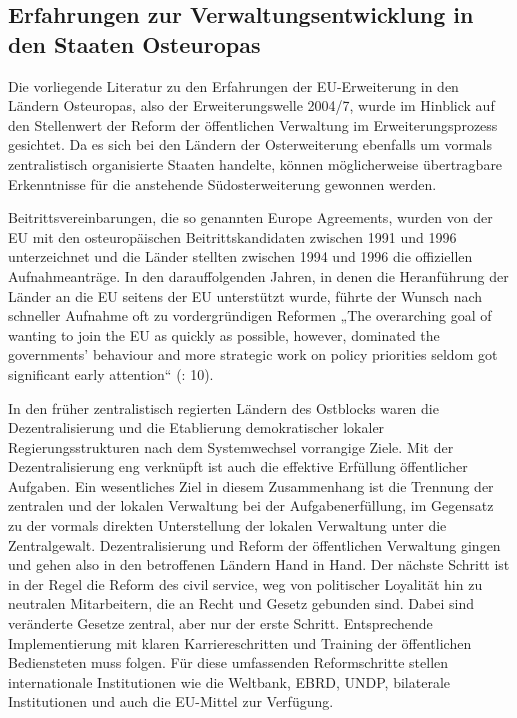 \subsection{Erfahrungen zur Verwaltungsentwicklung in den Staaten Osteuropas}
Die vorliegende Literatur zu den Erfahrungen der EU-Erweiterung in den Ländern Osteuropas, also der Erweiterungswelle 2004/7, wurde im Hinblick auf den Stellenwert der Reform der öffentlichen Verwaltung im Erweiterungsprozess gesichtet. Da es sich bei den Ländern der Osterweiterung ebenfalls um vormals zentralistisch organisierte Staaten handelte, können möglicherweise übertragbare Erkenntnisse für die anstehende Südosterweiterung gewonnen werden. \par

Beitrittsvereinbarungen, die so genannten Europe Agreements, wurden von der EU mit den osteuropäischen Beitrittskandidaten zwischen 1991 und 1996 unterzeichnet und die Länder stellten zwischen 1994 und 1996 die offiziellen Aufnahmeanträge. In den darauffolgenden Jahren, in denen die Heranführung der Länder an die EU seitens der EU unterstützt wurde, führte der Wunsch nach schneller Aufnahme oft zu vordergründigen Reformen „The overarching goal of wanting to join the EU as quickly as possible, however, dominated the governments’ behaviour and more strategic work on policy priorities seldom got significant early attention“ (\cite{summa}: 10).\par
In den früher zentralistisch regierten Ländern des Ostblocks waren die Dezentralisierung und die Etablierung demokratischer lokaler Regierungsstrukturen nach dem Systemwechsel vorrangige Ziele. Mit der Dezentralisierung eng verknüpft ist auch die effektive Erfüllung öffentlicher Aufgaben. Ein wesentliches Ziel in diesem Zusammenhang ist die Trennung der zentralen und der lokalen Verwaltung bei der Aufgabenerfüllung, im Gegensatz zu der vormals direkten Unterstellung der lokalen Verwaltung unter die Zentralgewalt. Dezentralisierung und Reform der öffentlichen Verwaltung gingen und gehen also in den betroffenen Ländern Hand in Hand. Der nächste Schritt ist in der Regel die Reform des civil service, weg von politischer Loyalität hin zu neutralen Mitarbeitern, die an Recht und Gesetz gebunden sind. Dabei sind veränderte Gesetze zentral, aber nur der erste Schritt. Entsprechende Implementierung mit klaren Karriereschritten und Training der öffentlichen Bediensteten muss folgen. Für diese umfassenden Reformschritte stellen internationale Institutionen wie die Weltbank, EBRD, UNDP, bilaterale Institutionen und auch die EU-Mittel zur Verfügung.\par
